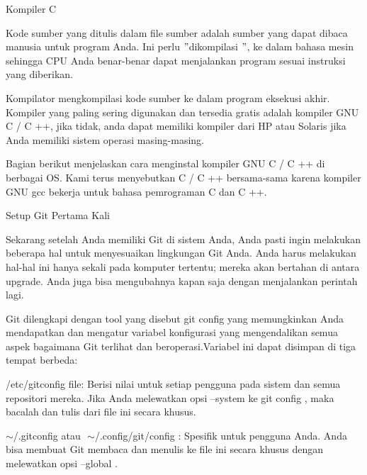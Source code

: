 \vspace{12pt}
\noindent 
Kompiler C \par
\vspace{12pt}
\noindent 
Kode sumber yang ditulis dalam file sumber adalah sumber yang dapat dibaca manusia untuk program Anda. Ini perlu  $ " $dikompilasi $ " $, ke dalam bahasa mesin sehingga CPU Anda benar-benar dapat menjalankan program sesuai instruksi yang diberikan. \par
\vspace{12pt}
\noindent 
Kompilator mengkompilasi kode sumber ke dalam program eksekusi akhir. Kompiler yang paling sering digunakan dan tersedia gratis adalah kompiler GNU C / C ++, jika tidak, anda dapat memiliki kompiler dari HP atau Solaris jika Anda memiliki sistem operasi masing-masing. \par
\vspace{12pt}
\noindent 
Bagian berikut menjelaskan cara menginstal kompiler GNU C / C ++ di berbagai OS. Kami terus menyebutkan C / C ++ bersama-sama karena kompiler GNU gcc bekerja untuk bahasa pemrograman C dan C ++. \par
\noindent 
Setup Git Pertama Kali \par
\vspace{12pt}
\noindent 
Sekarang setelah Anda memiliki Git di sistem Anda, Anda pasti ingin melakukan beberapa hal untuk menyesuaikan lingkungan Git Anda. $  $Anda harus melakukan hal-hal ini hanya sekali pada komputer tertentu; $  $mereka akan bertahan di antara upgrade. $  $Anda juga bisa mengubahnya kapan saja dengan menjalankan perintah lagi. \par
\vspace{12pt}
\noindent 
Git dilengkapi dengan tool yang disebut $  $git config $  $yang memungkinkan Anda mendapatkan dan mengatur variabel konfigurasi yang mengendalikan semua aspek bagaimana Git terlihat dan beroperasi.Variabel ini dapat disimpan di tiga tempat berbeda: \par
\vspace{12pt}
\noindent 
/etc/gitconfig $  $file: Berisi nilai untuk setiap pengguna pada sistem dan semua repositori mereka. $  $Jika Anda melewatkan opsi $  $--system $  $ke $  $git config $  $, maka bacalah dan tulis dari file ini secara khusus. \par
\vspace{12pt}
\noindent 
 $  \sim  $/.gitconfig $  $atau $  $ $  \sim  $/.config/git/config $  $: Spesifik untuk pengguna Anda. $  $Anda bisa membuat Git membaca dan menulis ke file ini secara khusus dengan melewatkan opsi $  $--global $  $. \par
